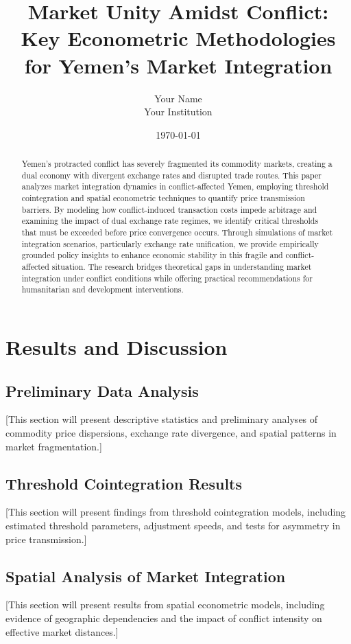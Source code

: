 \documentclass[12pt]{article}
\title{Market Unity Amidst Conflict: Key Econometric Methodologies for Yemen's Market Integration}
\author{Your Name\\Your Institution}
\date{\today}
\begin{document}
\maketitle

\begin{abstract}
  Yemen's protracted conflict has severely fragmented its commodity markets, creating a dual economy with divergent exchange rates and disrupted trade routes. This paper analyzes market integration dynamics in conflict-affected Yemen, employing threshold cointegration and spatial econometric techniques to quantify price transmission barriers. By modeling how conflict-induced transaction costs impede arbitrage and examining the impact of dual exchange rate regimes, we identify critical thresholds that must be exceeded before price convergence occurs. Through simulations of market integration scenarios, particularly exchange rate unification, we provide empirically grounded policy insights to enhance economic stability in this fragile and conflict-affected situation. The research bridges theoretical gaps in understanding market integration under conflict conditions while offering practical recommendations for humanitarian and development interventions.
\end{abstract}





\section{Results and Discussion}
\subsection{Preliminary Data Analysis}
[This section will present descriptive statistics and preliminary analyses of commodity price dispersions, exchange rate divergence, and spatial patterns in market fragmentation.]

\subsection{Threshold Cointegration Results}
[This section will present findings from threshold cointegration models, including estimated threshold parameters, adjustment speeds, and tests for asymmetry in price transmission.]

\subsection{Spatial Analysis of Market Integration}
[This section will present results from spatial econometric models, including evidence of geographic dependencies and the impact of conflict intensity on effective market distances.]
\end{document}
